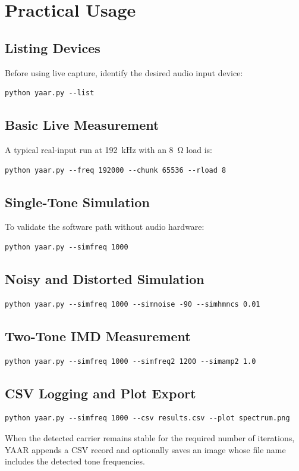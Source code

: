 \documentclass[conference]{IEEEtran}
\begin{document}
\section{Practical Usage}
\subsection{Listing Devices}
Before using live capture, identify the desired audio input device:
\begin{lstlisting}[style=shellstyle]
python yaar.py --list
\end{lstlisting}

\subsection{Basic Live Measurement}
A typical real-input run at \SI{192}{kHz} with an \SI{8}{\ohm} load is:
\begin{lstlisting}[style=shellstyle]
python yaar.py --freq 192000 --chunk 65536 --rload 8
\end{lstlisting}

\subsection{Single-Tone Simulation}
To validate the software path without audio hardware:
\begin{lstlisting}[style=shellstyle]
python yaar.py --simfreq 1000
\end{lstlisting}

\subsection{Noisy and Distorted Simulation}
\begin{lstlisting}[style=shellstyle]
python yaar.py --simfreq 1000 --simnoise -90 --simhmncs 0.01
\end{lstlisting}

\subsection{Two-Tone IMD Measurement}
\begin{lstlisting}[style=shellstyle]
python yaar.py --simfreq 1000 --simfreq2 1200 --simamp2 1.0
\end{lstlisting}

\subsection{CSV Logging and Plot Export}
\begin{lstlisting}[style=shellstyle]
python yaar.py --simfreq 1000 --csv results.csv --plot spectrum.png
\end{lstlisting}
When the detected carrier remains stable for the required number of iterations, YAAR appends a CSV record and optionally saves an image whose file name includes the detected tone frequencies.
\end{document}
